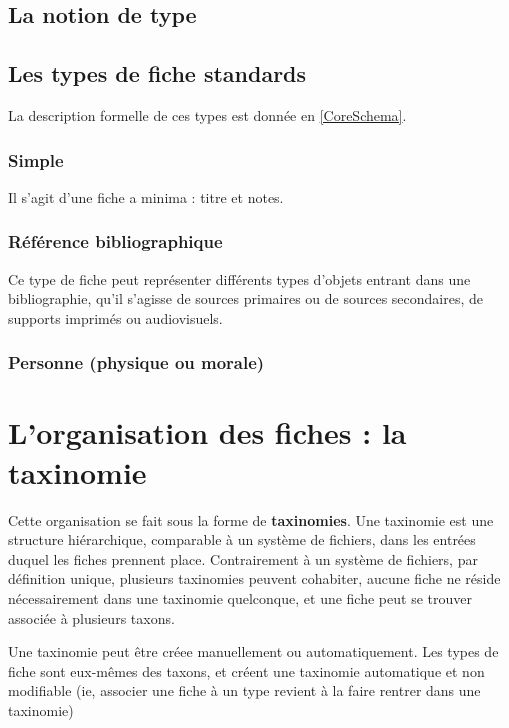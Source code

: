 \documentclass[11pt]{article}
\begin{document}
\subsection{La notion de type}\label{sub:Type}

\subsection{Les types de fiche standards}\label{sub:Types}

La description formelle de ces types est donnée en \vref{CoreSchema}.

\subsubsection{Simple}\label{simple}

Il s'agit d'une fiche a minima : titre et notes.

\subsubsection{Référence
bibliographique}\label{ruxe9fuxe9rence-bibliographique}

Ce type de fiche peut représenter différents types d'objets entrant dans
une bibliographie, qu'il s'agisse de sources primaires ou de sources
secondaires, de supports imprimés ou audiovisuels.

\subsubsection{Personne (physique ou
morale)}\label{personne-physique-ou-morale}

\section{L'organisation des fiches : la
taxinomie}\label{lorganisation-des-fiches-la-taxinomie}

Cette organisation se fait sous la forme de \textbf{taxinomies}. Une
taxinomie est une structure hiérarchique, comparable à un système de
fichiers, dans les entrées duquel les fiches prennent place.
Contrairement à un système de fichiers, par définition unique, plusieurs
taxinomies peuvent cohabiter, aucune fiche ne réside nécessairement dans
une taxinomie quelconque, et une fiche peut se trouver associée à
plusieurs taxons.

Une taxinomie peut être créee manuellement ou automatiquement. Les types
de fiche sont eux-mêmes des taxons, et créent une taxinomie automatique
et non modifiable (ie, associer une fiche à un type revient à la faire
rentrer dans une taxinomie)
\end{document}
